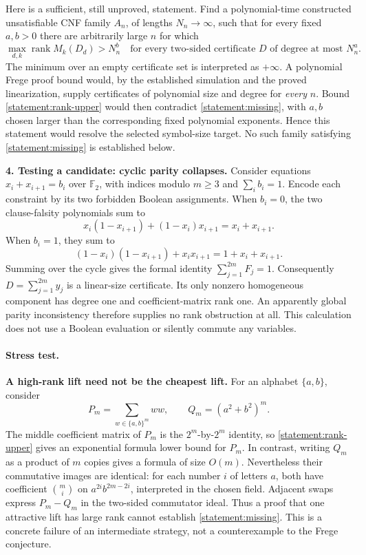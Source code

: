 \documentclass[11pt,a4paper]{article}
\numberwithin{equation}{section}
\begin{document}
Here is a sufficient, still unproved, statement. Find a polynomial-time
constructed unsatisfiable CNF family $A_n$, of lengths $N_n\to\infty$, such
that for every fixed $a,b>0$ there are arbitrarily large $n$ for which
\begin{equation}\label{statement:missing}
 \max_{d,k}\operatorname{rank}M_k(D_d)>N_n^b
 \quad\text{for every two-sided certificate $D$ of degree at most $N_n^a$.}
\end{equation}
The minimum over an empty certificate set is interpreted as $+\infty$.
A polynomial Frege proof bound would, by the established simulation and the
proved linearization, supply certificates of polynomial size and degree
for \emph{every} $n$. Bound \eqref{statement:rank-upper} would then contradict
\eqref{statement:missing}, with $a,b$ chosen larger than the corresponding fixed
polynomial exponents. Hence this statement would resolve the selected
symbol-size target. No such family satisfying \eqref{statement:missing} is
established below.

\medskip
\textbf{4. Testing a candidate: cyclic parity collapses.}
Consider equations $x_i+x_{i+1}=b_i$ over $\mathbb F_2$, with indices modulo
$m\geq3$ and $\sum_i b_i=1$. Encode each constraint by its two forbidden
Boolean assignments. When $b_i=0$, the two clause-falsity polynomials sum to
\[
 x_i(1-x_{i+1})+(1-x_i)x_{i+1}=x_i+x_{i+1}.
\]
When $b_i=1$, they sum to
\[
 (1-x_i)(1-x_{i+1})+x_ix_{i+1}=1+x_i+x_{i+1}.
\]
Summing over the cycle gives the formal identity $\sum_{j=1}^{2m}F_j=1$.
Consequently $D=\sum_{j=1}^{2m}y_j$ is a linear-size certificate. Its only
nonzero homogeneous component has degree one and coefficient-matrix rank
one. An apparently global parity inconsistency therefore supplies no rank
obstruction at all. This calculation does not use a Boolean evaluation or
silently commute any variables.

\paragraph{Stress test.}
\textbf{A high-rank lift need not be the cheapest lift.}
For an alphabet $\{a,b\}$, consider
\[
 P_m=\sum_{w\in\{a,b\}^m}ww,\qquad Q_m=(a^2+b^2)^m.
\]
The middle coefficient matrix of $P_m$ is the $2^m$-by-$2^m$ identity, so
\eqref{statement:rank-upper} gives an exponential formula lower bound for $P_m$.
In contrast, writing $Q_m$ as a product of $m$ copies gives a formula of size
$O(m)$. Nevertheless their commutative images are identical: for each
number $i$ of letters $a$, both have coefficient $\binom mi$ on
$a^{2i}b^{2m-2i}$, interpreted in the chosen field. Adjacent swaps express
$P_m-Q_m$ in the two-sided commutator ideal. Thus a proof that one attractive
lift has large rank cannot establish \eqref{statement:missing}. This is a concrete
failure of an intermediate strategy, not a counterexample to the Frege
conjecture.
\end{document}
